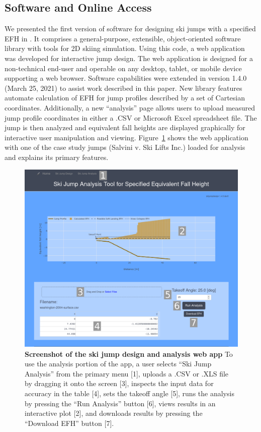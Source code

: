 \documentclass[smallextended]{svjour3}       %
\begin{document}
\subsection{Software and Online Access}
\label{sec:software}
%
We presented the first version of software for designing ski jumps with a
specified EFH in \cite{Moore2018}. It comprises a general-purpose, extensible,
object-oriented software library with tools for 2D skiing simulation. Using
this code, a web application was developed for interactive jump design. The web
application is designed for a non-technical end-user and operable on any
desktop, tablet, or mobile device supporting a web browser.
 Software capabilities were extended in version 1.4.0 (March 25,
2021) to assist work described in this paper. New library features automate
calculation of EFH for jump profiles described by a set of Cartesian
coordinates.  Additionally, a new ``analysis'' page allows users to upload
measured jump profile coordinates in either a .CSV or Microsoft Excel
spreadsheet file. The jump is then analyzed and equivalent fall heights are
displayed graphically for interactive user manipulation and viewing.
Figure~\ref{fig:web-app-screenshot} shows the web application with one of the
case study jumps (Salvini v. Ski Lifts Inc.) loaded for analysis and explains
its primary features.
%
\begin{figure}
  \centering
  \includegraphics[width=\columnwidth]{figures/web-app-screenshot.png}
  \caption{\textbf{Screenshot of the ski jump design and analysis web app} To
    use the analysis portion of the app, a user selects ``Ski Jump Analysis''
    from the primary menu [1], uploads a .CSV or .XLS file by dragging it onto
    the screen [3], inspects the input data for accuracy in the table [4], sets
    the takeoff angle [5], runs the analysis by pressing the ``Run Analysis''
    button [6], views results in an interactive plot [2], and downloads
     results by pressing the ``Download EFH'' button [7].}
  \label{fig:web-app-screenshot}
\end{figure}
\end{document}
